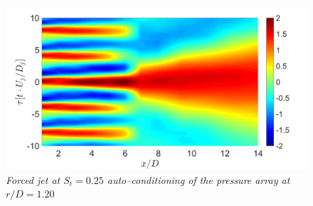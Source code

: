 \begin{figure}
	\centering
	\includegraphics[width=1\textwidth]{Figures/conditioning/autoCondSt0p25.png}
	\caption{\textit{Forced jet at $S_t = 0.25$ auto--conditioning of the pressure array at $r/D = 1.20$}}
	\label{fig:autoCondSt0p25}
\end{figure}

